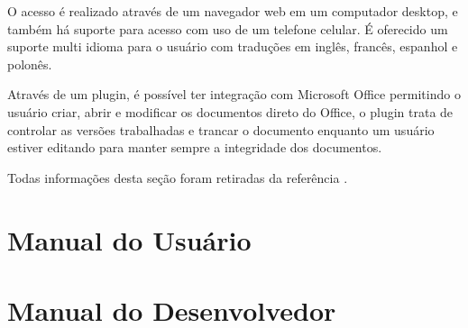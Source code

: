 \documentclass{abnt}
\begin{document}
	O acesso é realizado através de um navegador web em um computador desktop, e também há suporte para acesso com uso de
	um telefone celular. É oferecido um suporte multi idioma para o usuário com traduções em inglês, francês, espanhol e
	polonês.
	
	Através de um plugin, é possível ter integração com Microsoft Office permitindo o usuário criar, abrir e modificar os
	documentos direto do Office, o plugin trata de controlar as versões trabalhadas e trancar o documento enquanto um
	usuário estiver editando para manter sempre a integridade dos documentos.
	
	Todas informações desta seção foram retiradas da referência \cite{QUOTERO}.
	
	

\clearpage
\chapter{Manual do Usuário}
		
		


\clearpage
\chapter{Manual do Desenvolvedor}






\clearpage
\nocite{*}
		
		
\end{document}

